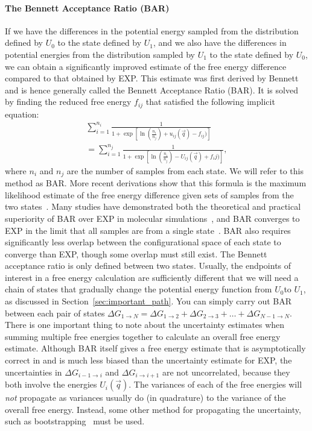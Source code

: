 \documentclass[9pt,bestpractices]{livecoms}
\begin{document}
\paragraph{The Bennett Acceptance Ratio (BAR)}
%
If we have the differences in the potential energy sampled from the distribution defined by $U_0$ to the state defined by $U_1$, and we also have the differences in potential energies from the distribution sampled by $U_1$ to the state defined by $U_0$, we can obtain a significantly improved estimate of the
free energy difference compared to that obtained by EXP. 
This estimate was first derived by Bennett and is hence generally called the Bennett Acceptance Ratio (BAR).  It is solved by finding the reduced free energy $f_{ij}$ that satisfied the following implicit equation:
\begin{eqnarray}
 \sum_{i=1}^{n_i} \frac{1}{1 + \exp[\ln(\frac{n_i}{n_j}) + u_{ij}(\vec{q}) - f_{ij})
 ]} \nonumber \\
 =\sum_{i=1}^{n_j} \frac{1}{1 + \exp[\ln(\frac{n_i}{n_j}) - U_{ij}(\vec{q}) + f_ij)]},
\end{eqnarray}
where $n_i$ and $n_j$ are the number of samples from each state. We
will refer to this method as BAR. More recent derivations show that this formula is the maximum likelihood estimate of the free energy difference given sets of samples from the two states~\cite{bennett1976efficient,shirts2003equilibriuma }. 
%
Many studies have demonstrated both the theoretical and practical superiority of BAR over EXP in molecular
simulations~\cite{shirts2005comparison,lu2003appropriate}, and BAR converges to EXP in the limit that all samples are from a single state~\cite{bennett1976efficient,bennett1976efficient,shirts2003equilibriuma}. BAR also requires significantly less overlap between the configurational space of each state to converge than EXP, though some overlap must still exist.
%
The Bennett acceptance ratio is only defined between two states. Usually, the endpoints of interest in a free energy calculation are sufficiently different that we will need a chain of states that gradually change the potential energy function from $U_0$to $U_1$, as discussed in Section~\ref{sec:important_path}. You can simply carry out BAR between each pair of states $\Delta G_{1 \rightarrow N} = \Delta {G_{1\rightarrow 2}} + \Delta {G_{2\rightarrow 3}} +  \ldots + \Delta G_{N-1\rightarrow N}$.
%
There is one important thing to note about the uncertainty estimates when summing multiple free energies together to calculate an overall free energy estimate. Although BAR itself gives a free energy estimate that is asymptotically correct in and is much less biased than the uncertainty estimate for EXP, the uncertainties in $\Delta {G_{i-1\rightarrow i}}$ and $\Delta {G_{i\rightarrow i+1}}$ are not uncorrelated, because they both involve the energies $U_i(\vec{q})$. The variances of each of the free energies will \textit{not} propagate as variances usually do (in quadrature) to the variance of the overall free energy. Instead, some other method for propagating the uncertainty, such as bootstrapping~\cite{grossfield2018best} must be used.
%
\end{document}
